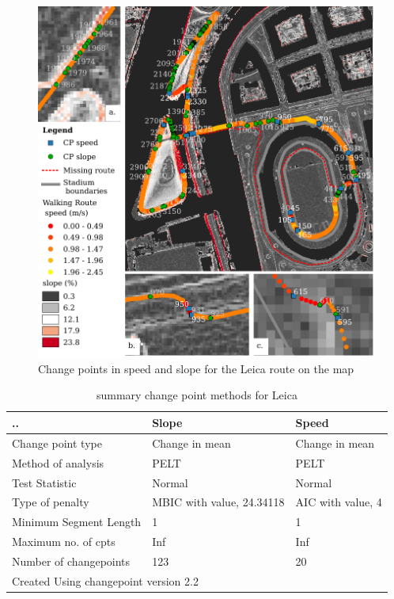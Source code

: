 \begin{figure}[ht]
\includegraphics[width=\textwidth]{img/R_leicaroute.pdf}
\centering
\caption{Change points in speed and slope for the Leica route on the map\label{routeLeicaMap}}
\end{figure}

\clearpage

\begin{table}[!ht]
\centering
\caption{summary change point methods for Leica}
\label{leicaCP}
\begin{tabular}{|p{175.3pt}|p{100.3pt}|p{100.3pt}|}
\hline
.. & Slope & Speed \\
\hline 
Change point type   	& Change in mean 	& Change in mean 	\\
Method of analysis	& PELT 				& PELT 				\\
Test Statistic 		& Normal 			& Normal 			\\
Type of penalty		&  MBIC with value, 24.34118  & AIC with value, 4  \\
Minimum Segment Length	& 1 			& 1 				 \\
Maximum no. of cpts 	&  Inf 			&  Inf  			 \\
Number of changepoints 	& 123			&  20				 \\
\hline
\multicolumn{3}{|l|}{Created Using changepoint version 2.2 } \\
\hline
\end{tabular}
\end{table}


